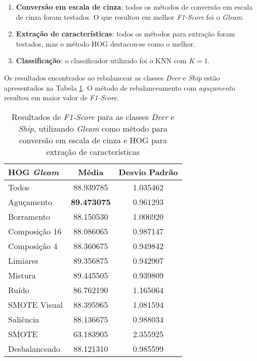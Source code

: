 \begin{enumerate}
\item \textbf{Conversão em escala de cinza}: todos os métodos de conversão em escala de cinza foram testados. O que resultou em melhor \textit{F1-Score} foi o \emph{Gleam}.

\item \textbf{Extração de características}: todos os métodos para extração foram testados, mas o método HOG destacou-se como o melhor.

\item \textbf{Classificação}: o classificador utilizado foi o KNN com $K=1$.

\end{enumerate}

Os resultados encontrados ao rebalancear as classes \textit{Deer} e \textit{Ship} estão apresentados na Tabela \ref{tab:resultados:5.1}. O método de rebalanceamento com \emph{aguçamento} resultou em maior valor de \textit{F1-Score}.

\begin{table}[H]
\begin{center}
\caption{Resultados de \textit{F1-Score} para as classes \textit{Deer} e \textit{Ship}, utilizando \emph{Gleam} como método para conversão em escala de cinza e HOG para extração de características}
\label{tab:resultados:5.1}
\begin{tabular}{|l|c|c|}
\hline
\textbf{HOG \emph{Gleam}} & \textbf{Média}     & \textbf{Desvio Padrão} \\ \hline
   Todos        &  88.939785 &  1.035462  \\ \hline
  Aguçamento    &  \textbf{89.473075} &  0.961293  \\ \hline
  Borramento    &  88.150530 &  1.006920  \\ \hline
  Composição 16 &  88.086065 &  0.987147  \\ \hline
  Composição 4  &  88.360675 &  0.949842  \\ \hline
  Limiares      &  89.356875 &  0.942907  \\ \hline
  Mistura       &  89.445505 &  0.939809  \\ \hline
  Ruído         &  86.762190 &  1.165064  \\ \hline
  SMOTE Visual  &  88.395965 &  1.081594  \\ \hline
  Saliência     &  88.136675 &  0.988034  \\ \hline
 SMOTE          &  63.183905 &  2.355925  \\ \hline
Desbalanceado   &  88.121310 &  0.985599  \\ \hline
\end{tabular}
\end{center}
\end{table}

